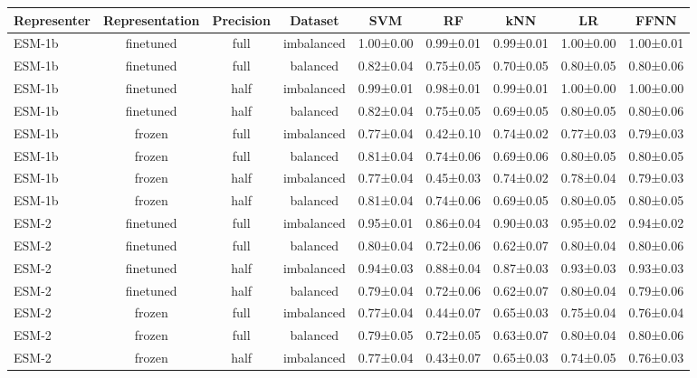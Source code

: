 \begin{tabular}{lcccccccc}
\toprule
 \textbf{Representer} & \textbf{Representation} & \textbf{Precision} &    \textbf{Dataset} &       \textbf{SVM} &        \textbf{RF} &       \textbf{kNN} &        \textbf{LR} &      \textbf{FFNN} \\
\midrule
      ESM-1b &      finetuned &      full & imbalanced & 1.00±0.00 & 0.99±0.01 & 0.99±0.01 & 1.00±0.00 & 1.00±0.01 \\
      ESM-1b &      finetuned &      full &   balanced & 0.82±0.04 & 0.75±0.05 & 0.70±0.05 & 0.80±0.05 & 0.80±0.06 \\
      ESM-1b &      finetuned &      half & imbalanced & 0.99±0.01 & 0.98±0.01 & 0.99±0.01 & 1.00±0.00 & 1.00±0.00 \\
      ESM-1b &      finetuned &      half &   balanced & 0.82±0.04 & 0.75±0.05 & 0.69±0.05 & 0.80±0.05 & 0.80±0.06 \\
      ESM-1b &         frozen &      full & imbalanced & 0.77±0.04 & 0.42±0.10 & 0.74±0.02 & 0.77±0.03 & 0.79±0.03 \\
      ESM-1b &         frozen &      full &   balanced & 0.81±0.04 & 0.74±0.06 & 0.69±0.06 & 0.80±0.05 & 0.80±0.05 \\
      ESM-1b &         frozen &      half & imbalanced & 0.77±0.04 & 0.45±0.03 & 0.74±0.02 & 0.78±0.04 & 0.79±0.03 \\
      ESM-1b &         frozen &      half &   balanced & 0.81±0.04 & 0.74±0.06 & 0.69±0.05 & 0.80±0.05 & 0.80±0.05 \\
       ESM-2 &      finetuned &      full & imbalanced & 0.95±0.01 & 0.86±0.04 & 0.90±0.03 & 0.95±0.02 & 0.94±0.02 \\
       ESM-2 &      finetuned &      full &   balanced & 0.80±0.04 & 0.72±0.06 & 0.62±0.07 & 0.80±0.04 & 0.80±0.06 \\
       ESM-2 &      finetuned &      half & imbalanced & 0.94±0.03 & 0.88±0.04 & 0.87±0.03 & 0.93±0.03 & 0.93±0.03 \\
       ESM-2 &      finetuned &      half &   balanced & 0.79±0.04 & 0.72±0.06 & 0.62±0.07 & 0.80±0.04 & 0.79±0.06 \\
       ESM-2 &         frozen &      full & imbalanced & 0.77±0.04 & 0.44±0.07 & 0.65±0.03 & 0.75±0.04 & 0.76±0.04 \\
       ESM-2 &         frozen &      full &   balanced & 0.79±0.05 & 0.72±0.05 & 0.63±0.07 & 0.80±0.04 & 0.80±0.06 \\
       ESM-2 &         frozen &      half & imbalanced & 0.77±0.04 & 0.43±0.07 & 0.65±0.03 & 0.74±0.05 & 0.76±0.03 \\

\end{tabular}
